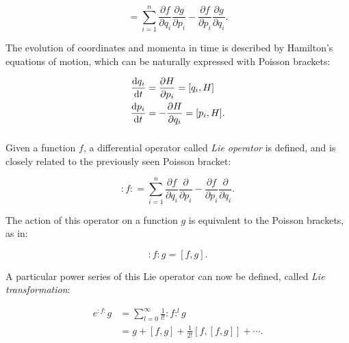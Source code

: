 \begin{equation}
    [f,g] = \sum^n_{i=1} \frac{\partial f}{\partial q_i} \frac{\partial g}{\partial p_i}
                       - \frac{\partial f}{\partial p_i} \frac{\partial g}{\partial q_i}.
    \label{eq:coordinate_systems:poisson_bracket}
\end{equation}


The evolution of coordinates and momenta in time is described by Hamilton's equations of motion, which can
be naturally expressed with Poisson brackets:

\begin{equation}
    \begin{aligned}
        \frac{\mathop{}\!\mathrm{d} q_i}{\mathop{}\!\mathrm{d} t} &= \frac{\partial H}{\partial p_i}  = [q_i, H] \\
        \frac{\mathop{}\!\mathrm{d} p_i}{\mathop{}\!\mathrm{d} t} &= -\frac{\partial H}{\partial q_i}  = [p_i, H].
    \end{aligned}
\end{equation}


\subsubsection{}

Given a function $f$, a differential operator called \textit{Lie operator} is defined, and is closely
related to the previously seen Poisson bracket:

\begin{equation}
    :f: = \sum^n_{i=1} \frac{\partial f}{\partial q_i} \frac{\partial}{\partial p_i}
                     - \frac{\partial f}{\partial p_i} \frac{\partial}{\partial q_i}.
\end{equation}

The action of this operator on a function $g$ is equivalent to the Poisson brackets, as in:

\begin{equation}
    :f:g = [f,g].
\end{equation}

A particular power series of this Lie operator can now be defined, called \textit{Lie
transformation}:

\begin{equation}
    \begin{aligned}
        e^{:f:}g &= \sum_{l=0}^\infty \frac{1}{l!} :f:^l g \\
                 &= g + [f,g] + \frac{1}{2!}[f, [f, g]] + \cdots .
    \end{aligned}
    \label{eq:coordinate_systems:expansion_exponential}
\end{equation}



